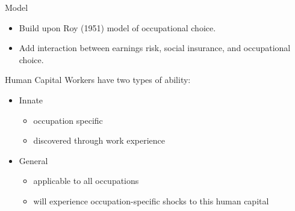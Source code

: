 \documentclass{beamer}
\begin{document}
\begin{frame}{Model}
  \begin{itemize}
    \item Build upon Roy (1951) model of occupational choice.
    \item Add interaction between earnings risk, social insurance, and occupational choice.
  \end{itemize}
\end{frame}
\begin{frame}{Human Capital}
  Workers have two types of ability:
  \begin{itemize}
    \item Innate 
    \begin{itemize}
      \item occupation specific
      \item discovered through work experience
    \end{itemize}
    \pause
    \item General
    \begin{itemize}
      \item applicable to all occupations
      \item will experience occupation-specific shocks to this human capital
    \end{itemize}
  \end{itemize}
\end{frame}
\end{document}
